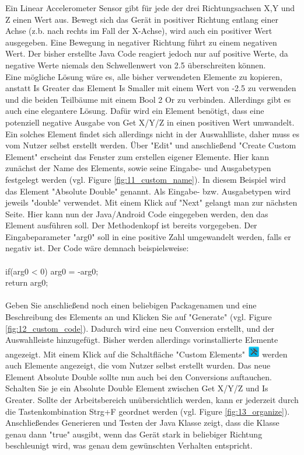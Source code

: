 Ein Linear Accelerometer Sensor gibt f\"ur jede der drei Richtungsachsen X,Y und Z einen Wert aus. Bewegt sich das Ger\"at in positiver Richtung entlang einer Achse (z.b. nach rechts im Fall der X-Achse), wird auch ein positiver Wert ausgegeben. Eine Bewegung in negativer Richtung f\"uhrt zu einem negativen Wert.
Der bisher erstellte Java Code reagiert jedoch nur auf positive Werte, da negative Werte niemals den Schwellenwert von 2.5 \"uberschreiten k\"onnen.
\\
Eine m\"ogliche L\"osung w\"are es, alle bisher verwendeten Elemente zu kopieren, anstatt Is Greater das Element Is Smaller mit einem Wert von -2.5 zu verwenden und die beiden Teilb\"aume mit einem Bool 2 Or zu verbinden.
Allerdings gibt es auch eine elegantere L\"osung. Daf\"ur wird ein Element ben\"otigt, dass eine potenziell negative Ausgabe von Get X/Y/Z in einen positiven Wert umwandelt.
Ein solches Element findet sich allerdings nicht in der Auswahlliste, daher muss es vom Nutzer selbst erstellt werden. \"Uber "Edit" und anschlie{\ss}end "Create Custom Element" erscheint das Fenster zum erstellen eigener Elemente. Hier kann zun\"achst der Name des Elements, sowie seine Eingabe- und Ausgabetypen  festgelegt werden (vgl. Figure \ref{fig:11_custom_name}). In diesem Beispiel wird das Element "Absolute Double" genannt. Als Eingabe- bzw. Ausgabetypen wird jeweils "double" verwendet. Mit einem Klick auf "Next" gelangt man zur n\"achsten Seite.
Hier kann nun der Java/Android Code eingegeben werden, den das Element ausf\"uhren soll. Der Methodenkopf ist bereits vorgegeben. Der Eingabeparameter "arg0" soll in eine positive Zahl umgewandelt werden, falls er negativ ist. Der Code w\"are demnach beispielsweise:
\\
\\
if(arg0 < 0) arg0 = -arg0;
\\
return arg0; 
\\
\\
Geben Sie anschlie{\ss}end noch einen beliebigen Packagenamen und eine Beschreibung des Elements an und Klicken Sie auf "Generate" (vgl. Figure \ref{fig:12_custom_code}). Dadurch wird eine neu Conversion erstellt, und der Auswahlleiste hinzugef\"ugt. Bisher werden allerdings vorinstallierte Elemente angezeigt. Mit einem Klick auf die Schaltfl\"ache "Custom Elements" \includegraphics[width = 15pt]{Manual/custom_elements} werden auch Elemente angezeigt, die vom Nutzer selbst erstellt wurden. Das neue Element Absolute Double sollte nun auch bei den Conversions auftauchen. Schalten Sie je ein Absolute Double Element zwischen Get X/Y/Z und Is Greater. Sollte der Arbeitsbereich un\"ubersichtlich werden, kann er jederzeit durch die Tastenkombination Strg+F geordnet werden (vgl. Figure \ref{fig:13_organize}). 
Anschlie{\ss}endes Generieren und Testen der Java Klasse zeigt, dass die Klasse genau dann "true" ausgibt, wenn das Ger\"at stark in beliebiger Richtung beschleunigt wird, was genau dem gew\"unschten Verhalten entspricht.

